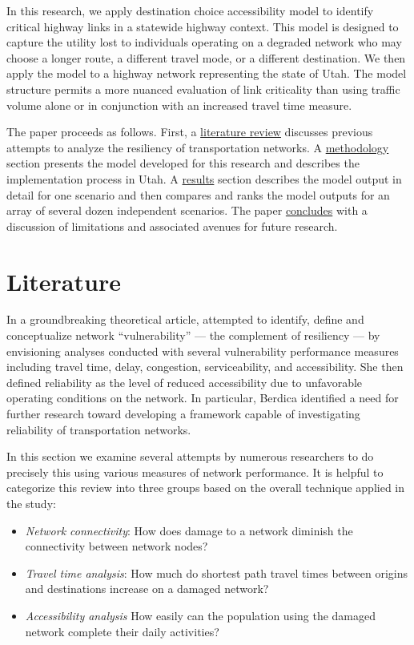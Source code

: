 \documentclass[3p, authoryear]{elsarticle} %
\begin{document}
In this research, we apply destination choice accessibility model to identify
critical highway links in a statewide highway context. This model is designed to
capture the utility lost to individuals operating on a degraded network who may
choose a longer route, a different travel mode, or a different destination. We
then apply the model to a highway network representing the state of Utah. The
model structure permits a more nuanced evaluation of link criticality than using
traffic volume alone or in conjunction with an increased travel time measure.

The paper proceeds as follows. First, a \protect\hyperlink{litreview}{literature review} discusses
previous attempts to analyze the resiliency of transportation networks. A
\protect\hyperlink{methodology}{methodology} section presents the model developed for this
research and describes the implementation process in Utah. A \protect\hyperlink{results}{results} section
describes the model output in detail for one scenario and then compares and ranks
the model outputs for an array of several dozen independent scenarios. The paper
\protect\hyperlink{conclusion}{concludes} with a discussion of limitations and associated avenues
for future research.

\hypertarget{litreview}{%
\section{Literature}\label{litreview}}

In a groundbreaking theoretical article, \citet{berdica2002} attempted to identify,
define and conceptualize network ``vulnerability'' --- the complement of
resiliency --- by envisioning analyses conducted with
several vulnerability performance measures including travel time, delay,
congestion, serviceability, and accessibility. She then defined reliability as
the level of reduced accessibility due to unfavorable operating conditions on
the network. In particular, Berdica identified a need for further research
toward developing a framework capable of investigating reliability of
transportation networks.

In this section we examine several attempts by numerous researchers to do
precisely this using various measures of network performance. It is helpful to
categorize this review into three groups based on the overall technique applied
in the study:

\begin{itemize}
\item
  \emph{Network connectivity}: How does damage to a network diminish the connectivity
  between network nodes?
\item
  \emph{Travel time analysis}: How much do shortest path travel times between origins
  and destinations increase on a damaged network?
\item
  \emph{Accessibility analysis} How easily can the population using the damaged
  network complete their daily activities?
\end{itemize}
\end{document}
